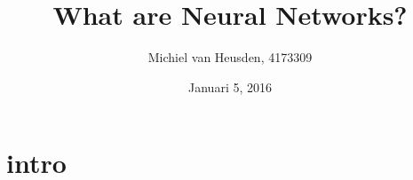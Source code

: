\documentclass[a4paper,12pt]{article}
\title{What are Neural Networks?}
\author{Michiel van Heusden, 4173309}
\date{Januari 5, 2016}
\begin{document}
  \maketitle
  \tableofcontents
  \section{intro}
\end{document}
